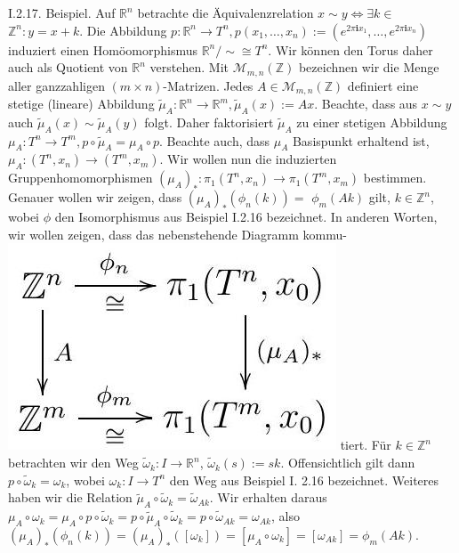 \documentclass[10pt]{article}
\begin{document}
I.2.17. Beispiel. Auf $\mathbb{R}^{n}$ betrachte die Äquivalenzrelation $x \sim y \Leftrightarrow \exists k \in$ $\mathbb{Z}^{n}: y=x+k$. Die Abbildung $p: \mathbb{R}^{n} \rightarrow T^{n}, p\left(x_{1}, \ldots, x_{n}\right):=\left(e^{2 \pi \mathbf{i} x_{1}}, \ldots, e^{2 \pi \mathbf{i} x_{n}}\right)$ induziert einen Homöomorphismus $\mathbb{R}^{n} / \sim \cong T^{n}$. Wir können den Torus daher auch als Quotient von $\mathbb{R}^{n}$ verstehen. Mit $\mathcal{M}_{m, n}(\mathbb{Z})$ bezeichnen wir die Menge aller ganzzahligen $(m \times n)$-Matrizen. Jedes $A \in \mathcal{M}_{m, n}(\mathbb{Z})$ definiert eine stetige (lineare) Abbildung $\tilde{\mu}_{A}: \mathbb{R}^{n} \rightarrow \mathbb{R}^{m}, \tilde{\mu}_{A}(x):=A x$. Beachte, dass aus $x \sim y$ auch $\tilde{\mu}_{A}(x) \sim \tilde{\mu}_{A}(y)$ folgt. Daher faktorisiert $\tilde{\mu}_{A}$ zu einer stetigen Abbildung $\mu_{A}: T^{n} \rightarrow T^{m}, p \circ \tilde{\mu}_{A}=\mu_{A} \circ p$. Beachte auch, dass $\mu_{A}$ Basispunkt erhaltend ist, $\mu_{A}:\left(T^{n}, x_{n}\right) \rightarrow\left(T^{m}, x_{m}\right)$. Wir wollen nun die induzierten Gruppenhomomorphismen $\left(\mu_{A}\right)_{*}: \pi_{1}\left(T^{n}, x_{n}\right) \rightarrow \pi_{1}\left(T^{m}, x_{m}\right)$ bestimmen. Genauer wollen wir zeigen, dass $\left(\mu_{A}\right)_{*}\left(\phi_{n}(k)\right)=$ $\phi_{m}(A k)$ gilt, $k \in \mathbb{Z}^{n}$, wobei $\phi$ den Isomorphismus aus Beispiel I.2.16 bezeichnet. In anderen Worten, wir wollen zeigen, dass das nebenstehende Diagramm kommu-\\
\includegraphics[max width=\textwidth]{2025_06_05_d7ed2bacd1e9ce1db1f0g-020} tiert. Für $k \in \mathbb{Z}^{n}$ betrachten wir den Weg $\tilde{\omega}_{k}: I \rightarrow \mathbb{R}^{n}$, $\tilde{\omega}_{k}(s):=s k$. Offensichtlich gilt dann $p \circ \tilde{\omega}_{k}=\omega_{k}$, wobei $\omega_{k}: I \rightarrow T^{n}$ den Weg aus Beispiel I. 2.16 bezeichnet. Weiteres haben wir die Relation $\tilde{\mu}_{A} \circ \tilde{\omega}_{k}=\tilde{\omega}_{A k}$. Wir erhalten daraus $\mu_{A} \circ \omega_{k}=\mu_{A} \circ p \circ \tilde{\omega}_{k}=p \circ \tilde{\mu}_{A} \circ \tilde{\omega}_{k}=p \circ \tilde{\omega}_{A k}=\omega_{A k}$, also $\left(\mu_{A}\right)_{*}\left(\phi_{n}(k)\right)=\left(\mu_{A}\right)_{*}\left(\left[\omega_{k}\right]\right)=\left[\mu_{A} \circ \omega_{k}\right]=\left[\omega_{A k}\right]=\phi_{m}(A k)$.
\end{document}
